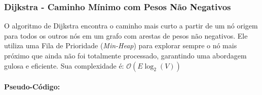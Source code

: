 \subsubsection{Dijkstra - Caminho Mínimo com Pesos Não Negativos}
O algoritmo de Dijkstra encontra o caminho mais curto a partir de um nó origem
para todos os outros nós em um grafo com arestas de pesos não negativos. Ele
utiliza uma Fila de Prioridade (\textit{Min-Heap}) para explorar sempre o nó
mais próximo que ainda não foi totalmente processado, garantindo uma abordagem
gulosa e eficiente. Sua complexidade é: $\mathcal{O}(E \log_{2}(V))$

\paragraph{Pseudo-Código: }\mbox{}\\
\begin{algorithm}[H]
	\SetAlgoLined

	\caption{Algoritmo de Dijkstra}
\end{algorithm}

